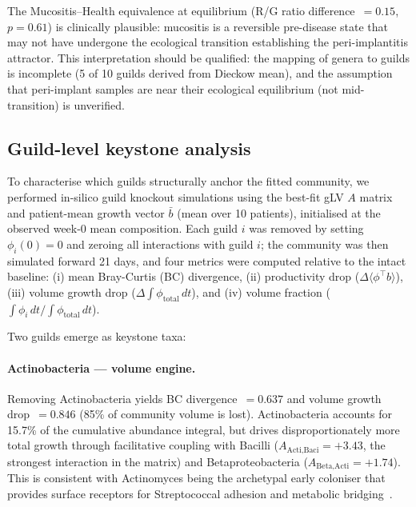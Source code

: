 \documentclass[11pt,a4paper]{article}
\begin{document}
The Mucositis--Health equivalence at equilibrium (R/G ratio difference~$=0.15$, $p=0.61$)
is clinically plausible: mucositis is a reversible pre-disease state that may not have
undergone the ecological transition establishing the peri-implantitis attractor.
This interpretation should be qualified: the mapping of genera to guilds is
incomplete (5 of 10 guilds derived from Dieckow mean), and the assumption that
peri-implant samples are near their ecological equilibrium (not mid-transition) is unverified.

\subsection{Guild-level keystone analysis}
\label{ssec:keystone}

To characterise which guilds structurally anchor the fitted community, we performed
in-silico guild knockout simulations using the best-fit gLV $A$ matrix and
patient-mean growth vector $\bar{b}$ (mean over 10 patients), initialised at
the observed week-0 mean composition. Each guild $i$ was removed by setting
$\phi_i(0)=0$ and zeroing all interactions with guild $i$; the community was then
simulated forward 21 days, and four metrics were computed relative to the intact
baseline: (i) mean Bray-Curtis (BC) divergence, (ii) productivity drop
($\Delta\langle\phi^\top b\rangle$), (iii) volume growth drop
($\Delta\!\int\!\phi_{\text{total}}\,dt$), and (iv) volume fraction
($\int\phi_i\,dt / \int\phi_{\text{total}}\,dt$).

Two guilds emerge as keystone taxa:

\paragraph{Actinobacteria — volume engine.}
Removing Actinobacteria yields BC divergence~$=0.637$ and volume growth
drop~$=0.846$ (85\% of community volume is lost). Actinobacteria accounts
for 15.7\% of the cumulative abundance integral, but drives disproportionately
more total growth through facilitative coupling with Bacilli
($A_{\text{Acti,Baci}}=+3.43$, the strongest interaction in the matrix)
and Betaproteobacteria ($A_{\text{Beta,Acti}}=+1.74$). This is consistent
with Actinomyces being the archetypal early coloniser that provides surface
receptors for Streptococcal adhesion and metabolic bridging~\citep{kolenbrander2000}.
\end{document}
